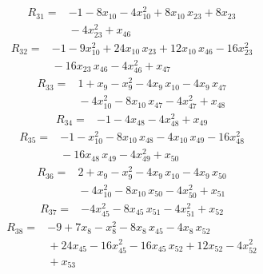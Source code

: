 \documentclass[11pt]{article}
\begin{document}
\begin{equation*}\begin{aligned}
R_{31}={}&-1 - 8x_{10} - 4x_{10}^{2} + 8x_{10}\,x_{23} + 8x_{23} \\
&{} - 4x_{23}^{2} + x_{46}
\end{aligned}\end{equation*}
\begin{equation*}\begin{aligned}
R_{32}={}&-1 - 9x_{10}^{2} + 24x_{10}\,x_{23} + 12x_{10}\,x_{46} - 16x_{23}^{2} \\
&{} - 16x_{23}\,x_{46} - 4x_{46}^{2} + x_{47}
\end{aligned}\end{equation*}
\begin{equation*}\begin{aligned}
R_{33}={}&1 + x_{9} - x_{9}^{2} - 4x_{9}\,x_{10} - 4x_{9}\,x_{47} \\
&{} - 4x_{10}^{2} - 8x_{10}\,x_{47} - 4x_{47}^{2} + x_{48}
\end{aligned}\end{equation*}
\begin{equation*}\begin{aligned}
R_{34}={}&-1 - 4x_{48} - 4x_{48}^{2} + x_{49}
\end{aligned}\end{equation*}
\begin{equation*}\begin{aligned}
R_{35}={}&-1 - x_{10}^{2} - 8x_{10}\,x_{48} - 4x_{10}\,x_{49} - 16x_{48}^{2} \\
&{} - 16x_{48}\,x_{49} - 4x_{49}^{2} + x_{50}
\end{aligned}\end{equation*}
\begin{equation*}\begin{aligned}
R_{36}={}&2 + x_{9} - x_{9}^{2} - 4x_{9}\,x_{10} - 4x_{9}\,x_{50} \\
&{} - 4x_{10}^{2} - 8x_{10}\,x_{50} - 4x_{50}^{2} + x_{51}
\end{aligned}\end{equation*}
\begin{equation*}\begin{aligned}
R_{37}={}&-4x_{45}^{2} - 8x_{45}\,x_{51} - 4x_{51}^{2} + x_{52}
\end{aligned}\end{equation*}
\begin{equation*}\begin{aligned}
R_{38}={}&-9 + 7x_{8} - x_{8}^{2} - 8x_{8}\,x_{45} - 4x_{8}\,x_{52} \\
&{} + 24x_{45} - 16x_{45}^{2} - 16x_{45}\,x_{52} + 12x_{52} - 4x_{52}^{2} \\
&{} + x_{53}
\end{aligned}\end{equation*}
\end{document}
